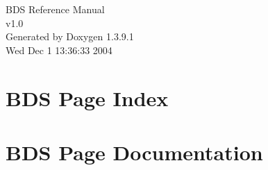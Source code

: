 \documentclass[a4paper]{book}
\begin{document}
\begin{titlepage}
\vspace*{7cm}
\begin{center}
{\Large BDS Reference Manual\\[1ex]\large v1.0 }\\
\vspace*{1cm}
{\large Generated by Doxygen 1.3.9.1}\\
\vspace*{0.5cm}
{\small Wed Dec 1 13:36:33 2004}\\
\end{center}
\end{titlepage}
\clearemptydoublepage
{}
\tableofcontents
\clearemptydoublepage
{}
\chapter{BDS Page Index}

\chapter{BDS Page Documentation}

\printindex
\end{document}
